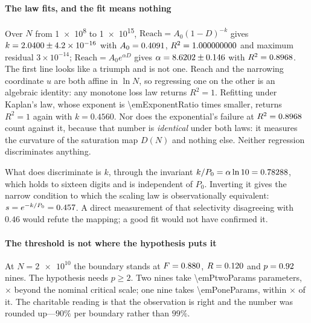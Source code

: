 \documentclass[conference]{IEEEtran}
\theoremstyle{definition}
\begin{document}
\paragraph{The law fits, and the fit means nothing} Over $N$ from
\num{1e8} to \num{1e15}, $\mathrm{Reach}=A_0(1-D)^{-k}$ gives
$k=2.0400\pm\num{4.2e-16}$ with $A_0=0.4091$, $R^2=1.000000000$ and maximum
residual $3\times10^{-14}$; $\mathrm{Reach}=A_0e^{\alpha D}$ gives
$\alpha=8.6202\pm0.146$ with $R^2=0.8968$. The first line looks like a triumph
and is not one. Reach and the narrowing coordinate $u$ are both affine in
$\ln N$, so regressing one on the other is an algebraic identity: any monotone
loss law returns $R^2=1$. Refitting under Kaplan's law, whose exponent is
\num{\emExponentRatio} times smaller, returns $R^2=1$ again with $k=0.4560$. Nor
does the exponential's failure at $R^2=0.8968$ count against it, because that
number is \emph{identical} under both laws: it measures the curvature of the
saturation map $D(N)$ and nothing else. Neither regression discriminates
anything.

What does discriminate is $k$, through the invariant
$k/P_0=\alpha\ln 10=0.78288$, which holds to sixteen digits and is
independent of $P_0$. Inverting it gives the narrow condition to which the
scaling law is observationally equivalent:
$s=e^{-k/P_0}=0.457$. A direct measurement of that selectivity
disagreeing with $0.46$ would refute the mapping; a good fit would not have
confirmed it.

\paragraph{The threshold is not where the hypothesis puts it} At $N=\num{2e10}$
the boundary stands at $F=0.880$, $R=0.120$ and
$p=0.92$ nines. The hypothesis needs $p\ge2$. Two nines take
\num{\emPtwoParams} parameters, \emPtweFactor$\times$ beyond the nominal critical
scale; one nine takes \num{\emPoneParams}, within \emPoneFactor$\times$ of it. The
charitable reading is that the observation is right and the number was rounded
up---$90\%$ per boundary rather than $99\%$.
\end{document}
